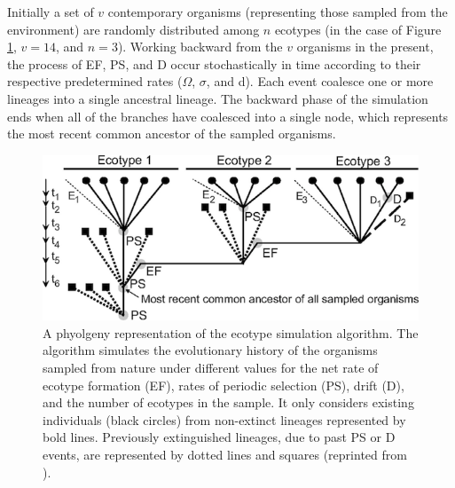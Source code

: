 Initially a set of $v$ contemporary organisms (representing those sampled from the environment) are randomly distributed among $n$ ecotypes (in the case of Figure \ref{fig:SpeciationGraph}, $v = 14$, and $n = 3$).
Working backward from the $v$ organisms in the present, the process of EF, PS, and D occur stochastically in time according to their respective predetermined rates ($\Omega$, $\sigma$, and d).
Each event coalesce one or more lineages into  a single ancestral lineage.
The backward phase of the simulation ends when all of the branches have coalesced into a single node, which represents the most recent common ancestor of the sampled organisms.

\begin{figure}[h!]

  \centering
   \includegraphics{images/Speciation-CH2}
   \caption[Detailed phylogeny with putative ecotype simulation events.]{A phyolgeny representation of the ecotype simulation algorithm. The algorithm simulates the evolutionary history of the organisms sampled from nature under different values for the net rate of ecotype formation (EF), rates of periodic selection (PS), drift (D), and the number of ecotypes in the sample. It only considers existing individuals (black circles) from non-extinct lineages represented by bold lines. Previously extinguished lineages, due to past PS or D events, are represented by dotted lines and squares (reprinted from \protect\cite{koeppel2008identifying}).}
   \label{fig:SpeciationGraph}
\end{figure}

